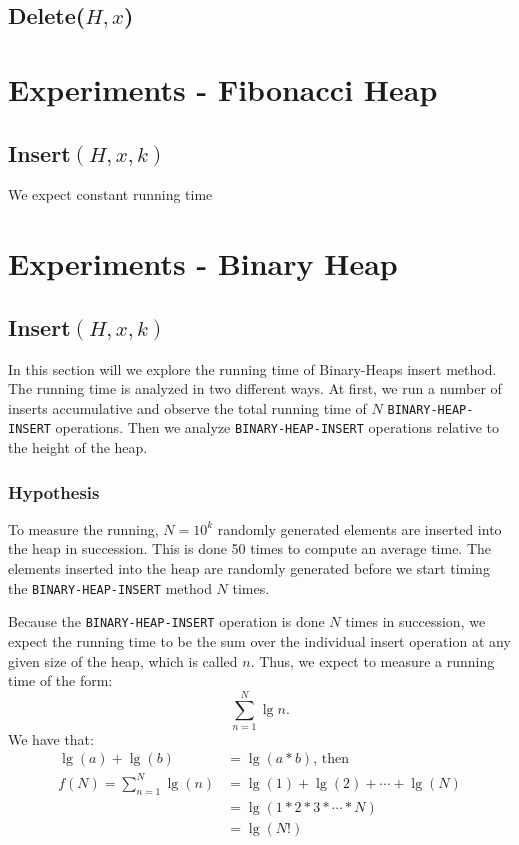 \documentclass[a4paper,oneside,11pt]{article}
\begin{document}
\subsection*{Delete($H, x$)}

\section*{Experiments - Fibonacci Heap}
\subsection*{Insert$(H,x,k)$}
We expect constant running time 

\section*{Experiments - Binary Heap}
\subsection*{Insert$(H,x,k)$}
In this section will we explore the running time of Binary-Heaps insert method. The running time is analyzed in two different ways. At first, we run a number of inserts accumulative and observe the total running time of $N$ \texttt{BINARY-HEAP-INSERT} operations. Then we analyze \texttt{BINARY-HEAP-INSERT} operations relative to the height of the heap.
\subsubsection*{Hypothesis}
To measure the running, $N=10^k$ randomly generated elements are inserted into the heap in succession. This is done 50 times to compute an average time. The elements inserted into the heap are randomly generated before we start timing the \texttt{BINARY-HEAP-INSERT} method $N$ times.

Because the \texttt{BINARY-HEAP-INSERT} operation is done $N$ times in succession, we expect the running time to be the sum over the individual insert operation at any given size of the heap, which is called $n$.
Thus, we expect to measure a running time of the form: \[\sum^N_{n=1}\lg n.\]
We have that:
\begin{align*}
  \lg(a)+\lg(b)&=\lg(a*b)\text{, then}\\
  f(N)=\sum^N_{n=1}\lg(n)&=\lg(1)+\lg(2)+\cdots+\lg(N)\\
  &=\lg(1*2*3*\cdots *N)\\
  &=\lg(N!)
\end{align*}
\end{document}
